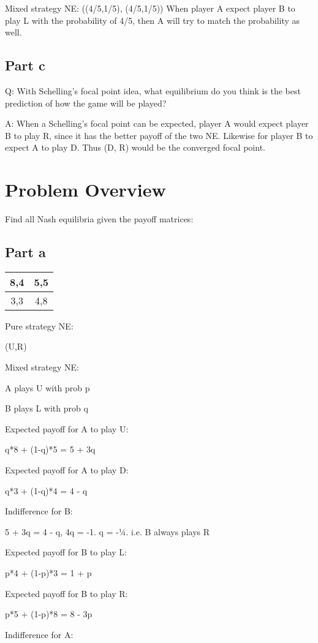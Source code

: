 \documentclass[twoside]{article}
\begin{document}
Mixed strategy NE: ((4/5,1/5), (4/5,1/5))
When player A expect player B to play L with the probability of 4/5, then A will try to match the probability as well.


\subsection{Part c}
Q: With Schelling's focal point idea, what equilibrium do you think is the best prediction of how the game will be played?

A: When a Schelling’s focal point can be expected, player A would expect player B to play R, since it has the better payoff of the two NE. Likewise for player B to expect A to play D. Thus (D, R) would be the converged focal point.

\section{Problem Overview}
Find all Nash equilibria given the payoff matrices:

\subsection{Part a}
\begin{tabular}{ |c|c| } 
 \hline
 8,4 & 5,5 \\ 
\hline
 3,3 & 4,8 \\ 
 \hline
\end{tabular}

Pure strategy NE:

(U,R)

Mixed strategy NE:

A plays U with prob p

B plays L with prob q

Expected payoff for A to play U:

q*8 + (1-q)*5 = 5 + 3q

Expected payoff for A to play D:

q*3 + (1-q)*4 = 4 - q

Indifference for B:

5 + 3q = 4 - q, 4q = -1. q = -1⁄4. i.e. B always plays R 

Expected payoff for B to play L:

p*4 + (1-p)*3 = 1 + p

Expected payoff for B to play R:

p*5 + (1-p)*8 = 8 - 3p

Indifference for A:
\end{document}
